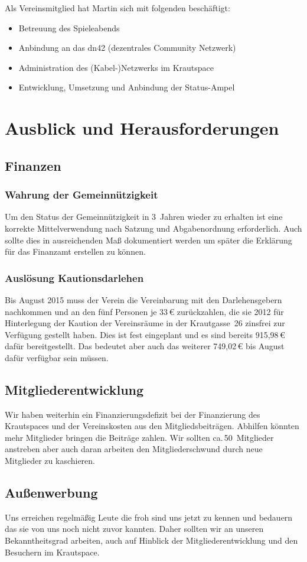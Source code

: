 \documentclass[10pt,DIV16]{scrartcl}
\begin{document}
Als Vereinsmitglied hat Martin sich mit folgenden beschäftigt: 
\begin{itemize}
	\item Betreuung des Spieleabends
	\item Anbindung an das dn42 (dezentrales Community Netzwerk)
	\item Administration des (Kabel-)Netzwerks im Krautspace
	\item Entwicklung, Umsetzung und Anbindung der Status-Ampel
\end{itemize}

\section{Ausblick und Herausforderungen}

\subsection{Finanzen}
\label{sec:ausblick:finanzen}

\subsubsection{Wahrung der Gemeinnützigkeit}
Um den Status der Gemeinnützigkeit in 3~Jahren wieder zu erhalten ist eine korrekte Mittelverwendung nach Satzung und Abgabenordnung erforderlich.
Auch sollte dies in ausreichenden Maß dokumentiert werden um später die Erklärung für das Finanzamt erstellen zu können.

\subsubsection{Auslösung Kautionsdarlehen}
\label{sec:katrionsdarlehen}
Bis August 2015 muss der Verein die Vereinbarung mit den Darlehensgebern nachkommen und an den fünf Personen je 33\,\euro{} zurückzahlen, die sie 2012 für Hinterlegung der Kaution der Vereinsräume in der Krautgasse~26 zinsfrei zur Verfügung gestellt haben.
Dies ist fest eingeplant und es sind bereits 915,98\,\euro{} dafür bereitgestellt.
Das bedeutet aber auch das weiterer 749,02\,\euro{} bis August dafür verfügbar sein müssen.

\subsection{Mitgliederentwicklung}
Wir haben weiterhin ein Finanzierungsdefizit bei der Finanzierung des Krautspaces und der Vereinskosten aus den Mitgliedsbeiträgen.
Abhilfen könnten mehr Mitglieder bringen die Beiträge zahlen.
Wir sollten ca.\,50~Mitglieder anstreben aber auch daran arbeiten den Mitgliederschwund durch neue Mitglieder zu kaschieren.

\subsection{Außenwerbung}
Uns erreichen regelmäßig Leute die froh sind uns jetzt zu kennen und bedauern das sie von uns noch nicht zuvor kannten.
Daher sollten wir an unseren Bekanntheitsgrad arbeiten, auch auf Hinblick der Mitgliederentwicklung und den Besuchern im Krautspace.
\end{document}
